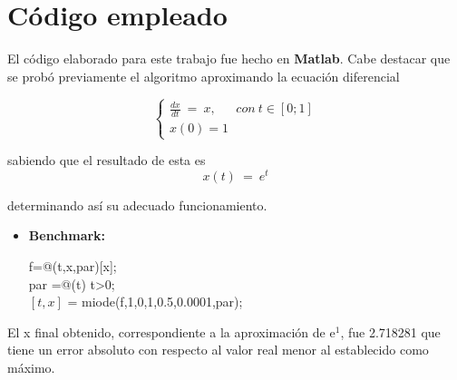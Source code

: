 \documentclass[a4paper]{article}
\begin{document}
\section{Código empleado}
El código elaborado para este trabajo fue hecho en \textbf{Matlab}.
Cabe destacar que se probó previamente el algoritmo aproximando la ecuación diferencial

\[\left\{
  \begin{array}{lr}
    \frac{dx}{dt} \ = \ x, \ \ \ \ \ \ \ con \ t \in [0;1]\\
    x(0) = 1
  \end{array}
\right.
\]

sabiendo que el resultado de esta es
\[ x(t) \ = \ e^t \]

determinando así su adecuado funcionamiento.

\begin{itemize}
	\item \textbf{Benchmark:}
	\begin{tabbing}
	 f=@(t,x,par)[x];\\
	 par =@(t) t>0; \\
	$[t,x]$ = miode(f,1,0,1,0.5,0.0001,par);\\
	\end{tabbing}
\end{itemize}
	
	El x final obtenido, correspondiente a la aproximación de e$^1$, fue 2.718281 que tiene un error absoluto con respecto al valor real menor al establecido como máximo.
	
	\newpage
	
\end{document}
